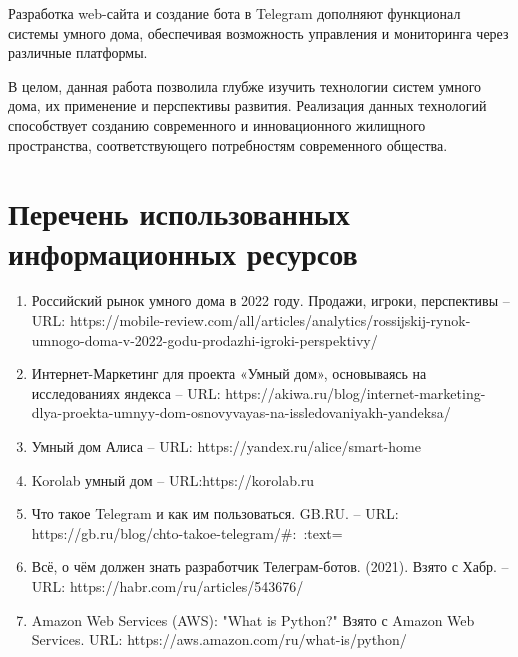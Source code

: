 Разработка web-сайта и создание бота в Telegram дополняют функционал системы умного дома, обеспечивая возможность управления и мониторинга через различные платформы.

В целом, данная работа позволила глубже изучить технологии систем умного дома, их применение и перспективы развития. Реализация данных технологий способствует созданию современного и инновационного жилищного пространства, соответствующего потребностям современного общества.

\chapter{Перечень использованных информационных ресурсов}

\begin{enumerate}

    \item \label{i1} Российский рынок умного дома в 2022 году. Продажи, игроки, перспективы – URL: https://mobile-review.com/all/articles/analytics/rossijskij-rynok-umnogo-doma-v-2022-godu-prodazhi-igroki-perspektivy/   

    \item \label{i2} Интернет-Маркетинг для проекта «Умный дом», основываясь на исследованиях яндекса – URL: https://akiwa.ru/blog/internet-marketing-dlya-proekta-umnyy-dom-osnovyvayas-na-issledovaniyakh-yandeksa/

    \item \label{i3} Умный дом Алиса – URL:  https://yandex.ru/alice/smart-home 

    \item \label{i4} Korolab умный дом – URL:https://korolab.ru 

    \item \label{i5} Что такое Telegram и как им пользоваться. GB.RU. – URL: https://gb.ru/blog/chto-takoe-telegram/\#:~:text=%

    \item \label{i6} Всё, о чём должен знать разработчик Телеграм-ботов. (2021). Взято с Хабр. – URL: https://habr.com/ru/articles/543676/ 

    \item \label{i7} Amazon Web Services (AWS): "What is Python?" Взято с Amazon Web Services. URL: https://aws.amazon.com/ru/what-is/python/


\end{enumerate}

